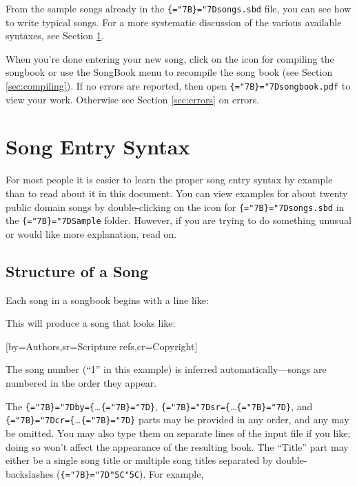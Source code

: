 \documentclass[12pt,oneside,letterpaper]{article}
\newcommand{\mytt}{\tt\chardef\{="7B\chardef\}="7D\relax}
\newcommand{\ppath}[1]{{\mytt#1}}
\newcommand{\ltx}[1]{{\mytt#1}}
\newcommand{\lesc}{\char"5C\relax}
\newcommand{\sbeg}[1]{\ltx{\textcolor{sbdsng}{#1}}}
\newenvironment{bsexample}{%
  \noindent\hfil\vbox\bgroup%
    \hsize3in\versesep=5pt\vskip1pt\setcounter{songnum}{1}%
}{%
  \egroup\par%
}
\newcommand{\example}[1]{{\hangindent=1in\hangafter=1\parindent=0.5in{#1}\par}}
\begin{document}
From the sample songs already in the \ppath{songs.sbd} file, you can see how
to write typical songs.
For a more systematic discussion of the various available syntaxes, see
Section \ref{sec:syntax}.

When you're done entering your new song, click on the icon for compiling the
songbook or use the SongBook menu to recompile the song book
(see Section \ref{sec:compiling}).
If no errors are reported, then open \ppath{songbook.pdf} to view your work.
Otherwise see Section \ref{sec:errors} on errors.


\section{Song Entry Syntax}\label{sec:syntax}

For most people it is easier to learn the proper song entry syntax by
example than to read about it in this document.
You can view examples for about twenty public domain songs by 
double-clicking on the icon for \ppath{songs.sbd} in the \ppath{Sample}
folder.
However, if you are trying to do something unusual or would like more
explanation, read on.

\subsection{Structure of a Song}\label{sec:beginsong}

Each song in a songbook begins with a line like:

\example{\ltx{\sbeg{\lesc beginsong\{Title\}[by=\{}Authors\sbeg{\},sr=\{}Scripture refs\sbeg{\},cr=\{}Copyright\sbeg{\}]}}}

\noindent This will produce a song that looks like:

\begin{bsexample}%
[by={Authors},sr={Scripture refs},cr={Copyright}]
\endsong%
\end{bsexample}

\noindent The song number (``1'' in this example) is inferred
automatically---songs are numbered in the order they appear.

The \sbeg{by=\{}\ldots\sbeg{\}},
\sbeg{sr=\{}\ldots\sbeg{\}}, and
\sbeg{cr=\{}\ldots\sbeg{\}} parts may be provided in any order,
and any may be omitted.
You may also type them on separate lines of the input file if you like;
doing so won't affect the appearance of the resulting book.
The ``Title'' part may either be a single song title or multiple song
titles separated by double-backslashes (\sbeg{\lesc\lesc}).
For example,
\end{document}
